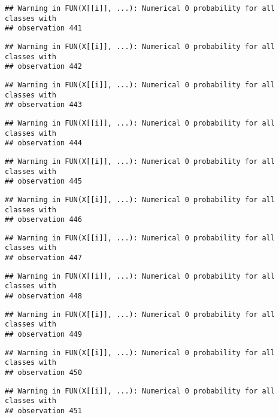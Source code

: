 \documentclass[
]{article}
\begin{document}
\begin{verbatim}
## Warning in FUN(X[[i]], ...): Numerical 0 probability for all classes with
## observation 441
\end{verbatim}

\begin{verbatim}
## Warning in FUN(X[[i]], ...): Numerical 0 probability for all classes with
## observation 442
\end{verbatim}

\begin{verbatim}
## Warning in FUN(X[[i]], ...): Numerical 0 probability for all classes with
## observation 443
\end{verbatim}

\begin{verbatim}
## Warning in FUN(X[[i]], ...): Numerical 0 probability for all classes with
## observation 444
\end{verbatim}

\begin{verbatim}
## Warning in FUN(X[[i]], ...): Numerical 0 probability for all classes with
## observation 445
\end{verbatim}

\begin{verbatim}
## Warning in FUN(X[[i]], ...): Numerical 0 probability for all classes with
## observation 446
\end{verbatim}

\begin{verbatim}
## Warning in FUN(X[[i]], ...): Numerical 0 probability for all classes with
## observation 447
\end{verbatim}

\begin{verbatim}
## Warning in FUN(X[[i]], ...): Numerical 0 probability for all classes with
## observation 448
\end{verbatim}

\begin{verbatim}
## Warning in FUN(X[[i]], ...): Numerical 0 probability for all classes with
## observation 449
\end{verbatim}

\begin{verbatim}
## Warning in FUN(X[[i]], ...): Numerical 0 probability for all classes with
## observation 450
\end{verbatim}

\begin{verbatim}
## Warning in FUN(X[[i]], ...): Numerical 0 probability for all classes with
## observation 451
\end{verbatim}
\end{document}
